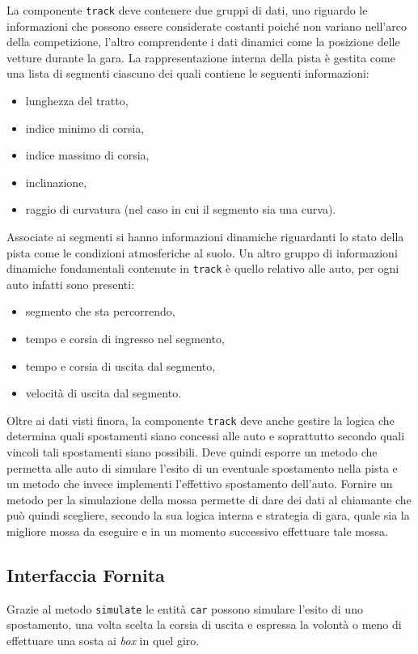 \documentclass[a4paper]{report}
\newcommand{\fun}[1]{\texttt{#1}}
\begin{document}
La componente \texttt{track} deve contenere due gruppi di dati, uno riguardo le informazioni che possono essere considerate costanti poiché non variano nell'arco della competizione, l'altro comprendente i dati dinamici come la posizione delle vetture durante la gara.
La rappresentazione interna della pista è gestita come una lista di segmenti ciascuno dei quali contiene le seguenti informazioni:
\begin{itemize}
\item lunghezza del tratto,
\item indice minimo di corsia,
\item indice massimo di corsia,
\item inclinazione,
\item raggio di curvatura (nel caso in cui il segmento sia una curva).
\end{itemize}
Associate ai segmenti si hanno informazioni dinamiche riguardanti lo stato della pista come le condizioni atmosferiche al suolo.
Un altro gruppo di informazioni dinamiche fondamentali contenute in \texttt{track} è quello relativo alle auto, per ogni auto infatti sono presenti:
\begin{itemize}
\item segmento che sta percorrendo,
\item tempo e corsia di ingresso nel segmento,
\item tempo e corsia di uscita dal segmento,
\item velocità di uscita dal segmento.
\end{itemize}

Oltre ai dati visti finora, la componente \texttt{track} deve anche gestire la logica che determina quali spostamenti siano concessi alle auto e soprattutto secondo quali vincoli tali spostamenti siano possibili. Deve quindi esporre un metodo che permetta alle auto di simulare l'esito di un eventuale spostamento nella pista e un metodo che invece implementi l'effettivo spostamento dell'auto. Fornire un metodo per la simulazione della mossa permette di dare dei dati al chiamante che può quindi scegliere, secondo la sua logica interna e strategia di gara, quale sia la migliore mossa da eseguire e in un momento successivo effettuare tale mossa.

\subsection*{Interfaccia Fornita}
Grazie al metodo \fun{simulate} le entità \texttt{car} possono simulare l'esito di uno spostamento, una volta scelta la corsia di uscita e espressa la volontà o meno di effettuare una sosta ai \textit{box} in quel giro.
\end{document}
